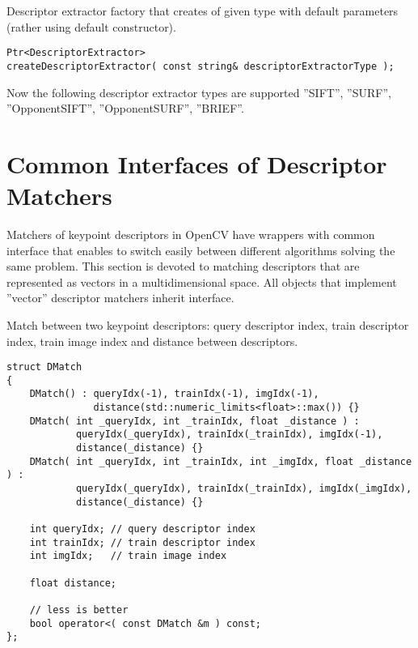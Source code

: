 Descriptor extractor factory that creates  of given type with 
default parameters (rather using default constructor).

\begin{lstlisting}
Ptr<DescriptorExtractor> 
createDescriptorExtractor( const string& descriptorExtractorType );
\end{lstlisting}

\begin{description}
\end{description}

Now the following descriptor extractor types are supported ''SIFT'', ''SURF'', 
''OpponentSIFT'', ''OpponentSURF'', ''BRIEF''.

\section{Common Interfaces of Descriptor Matchers}
Matchers of keypoint descriptors in OpenCV have wrappers with common interface that enables to switch easily 
between different algorithms solving the same problem. This section is devoted to matching descriptors 
that are represented as vectors in a multidimensional space. All objects that implement ''vector'' 
descriptor matchers inherit  interface.

Match between two keypoint descriptors: query descriptor index, 
train descriptor index, train image index and distance between descriptors.

\begin{lstlisting}
struct DMatch
{
    DMatch() : queryIdx(-1), trainIdx(-1), imgIdx(-1), 
               distance(std::numeric_limits<float>::max()) {}
    DMatch( int _queryIdx, int _trainIdx, float _distance ) :
            queryIdx(_queryIdx), trainIdx(_trainIdx), imgIdx(-1), 
            distance(_distance) {}
    DMatch( int _queryIdx, int _trainIdx, int _imgIdx, float _distance ) :
            queryIdx(_queryIdx), trainIdx(_trainIdx), imgIdx(_imgIdx), 
            distance(_distance) {}

    int queryIdx; // query descriptor index
    int trainIdx; // train descriptor index
    int imgIdx;   // train image index

    float distance;

    // less is better
    bool operator<( const DMatch &m ) const;
};
\end{lstlisting}

